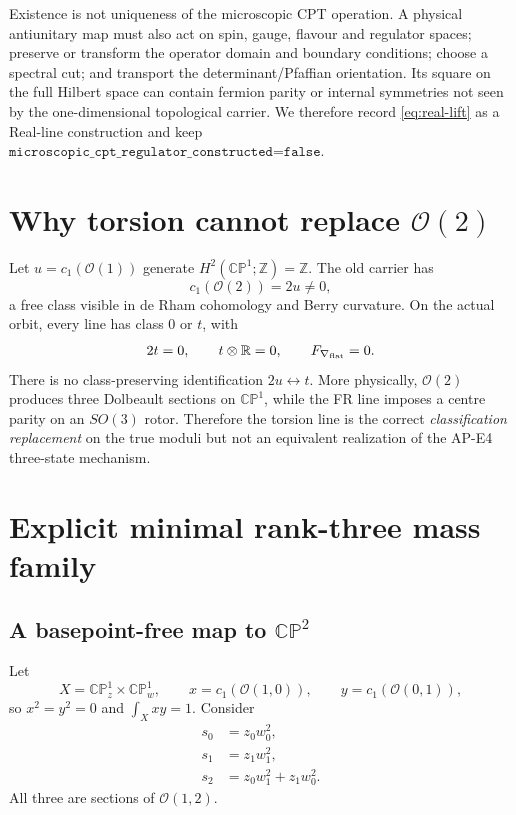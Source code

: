 \documentclass[11pt]{article}
\theoremstyle{definition}
\theoremstyle{remark}
\newcommand{\RR}{\mathbb R}
\newcommand{\ZZ}{\mathbb Z}
\newcommand{\CP}{\mathbb {CP}}
\newcommand{\cO}{\mathcal O}
\begin{document}
Existence is not uniqueness of the microscopic CPT operation.  A physical
antiunitary map must also act on spin, gauge, flavour and regulator spaces;
preserve or transform the operator domain and boundary conditions; choose a
spectral cut; and transport the determinant/Pfaffian orientation.  Its square
on the full Hilbert space can contain fermion parity or internal symmetries
not seen by the one-dimensional topological carrier.  We therefore record
\eqref{eq:real-lift} as a Real-line construction and keep
\(\texttt{microscopic\_cpt\_regulator\_constructed=false}\).

\section{Why torsion cannot replace \texorpdfstring{\(\cO(2)\)}{O(2)}}

Let \(u=c_1(\cO(1))\) generate \(H^2(\CP^1;\ZZ)=\ZZ\).  The old carrier has
\[
 c_1(\cO(2))=2u\ne0,
\]
a free class visible in de Rham cohomology and Berry curvature.  On the actual
orbit, every line has class \(0\) or \(t\), with
\[
 2t=0,
 \qquad t\otimes\RR=0,
 \qquad F_{\nabla_{\rm flat}}=0.
\]
There is no class-preserving identification \(2u\leftrightarrow t\).  More
physically, \(\cO(2)\) produces three Dolbeault sections on \(\CP^1\), while
the FR line imposes a centre parity on an \(SO(3)\) rotor.  Therefore the
torsion line is the correct \emph{classification replacement} on the true
moduli but not an equivalent realization of the AP-E4 three-state mechanism.

\section{Explicit minimal rank-three mass family}

\subsection{A basepoint-free map to \texorpdfstring{\(\CP^2\)}{CP2}}

Let
\[
 X=\CP^1_z\times\CP^1_w,
 \qquad x=c_1(\cO(1,0)),\qquad y=c_1(\cO(0,1)),
\]
so \(x^2=y^2=0\) and \(\int_Xxy=1\).  Consider
\begin{equation}
 \begin{aligned}
 s_0&=z_0w_0^2,\\
 s_1&=z_1w_1^2,\\
 s_2&=z_0w_1^2+z_1w_0^2.
 \end{aligned}
 \label{eq:sections}
\end{equation}
All three are sections of \(\cO(1,2)\).
\end{document}
